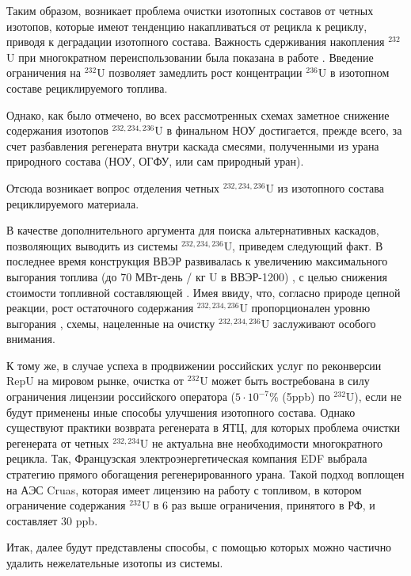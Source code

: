 Таким образом, возникает проблема очистки изотопных составов от четных изотопов, которые имеют тенденцию накапливаться от рецикла к рециклу, приводя к деградации изотопного состава.
Важность сдерживания накопления $^{232}$U при многократном переиспользовании была показана в работе \cite{smirnovEvolutionIsotopicComposition2012}.
Введение ограничения на $^{232}$U позволяет замедлить рост концентрации $^{236}$U в изотопном составе рециклируемого топлива.

Однако, как было отмечено, во всех рассмотренных схемах заметное снижение содержания изотопов $^{232,234,236}$U в финальном НОУ достигается, прежде всего, за счет разбавления регенерата внутри каскада смесями, полученными из урана природного состава (НОУ, ОГФУ, или сам природный уран).

Отсюда возникает вопрос отделения четных $^{232,234,236}$U из изотопного состава рециклируемого материала.

В качестве дополнительного аргумента для поиска альтернативных каскадов, позволяющих выводить из системы $^{232,234,236}$U, приведем следующий факт.
В последнее время конструкция ВВЭР развивалась к увеличению максимального выгорания топлива (до 70 МВт-день / кг U в ВВЭР-1200) \cite{asmolovNewGenerationFirstofthe2017}, с целью снижения стоимости топливной составляющей \cite{andrianovaPovyshenievygoraniyaToplivaVVER2008}.
Имея ввиду, что, согласно природе цепной реакции, рост остаточного содержания $^{232,234,236}$U пропорционален уровню выгорания \cite{VeryHighBurnups2006}, схемы, нацеленные на очистку $^{232,234,236}$U заслуживают особого внимания.

К тому же, в случае успеха в продвижении российских услуг по реконверсии RepU на мировом рынке, очистка от $^{232}$U может быть востребована в силу ограничения лицензии российского оператора ($5\cdot10^{-7}$\% (5ppb) по $^{232}$U), если не будут применены иные способы улучшения изотопного состава.
Однако существуют практики возврата регенерата в ЯТЦ, для которых проблема очистки регенерата от четных $^{232,234}$U не актуальна вне необходимости многократного рецикла. Так, Французская электроэнергетическая компания EDF выбрала стратегию прямого обогащения регенерированного урана. Такой подход воплощен на АЭС Cruas, которая имеет лицензию на работу с топливом, в котором ограничение содержания $^{232}$U в 6 раз выше ограничения, принятого в РФ, и составляет 30 ppb.

Итак, далее будут представлены способы, с помощью которых можно частично удалить нежелательные изотопы из системы.


